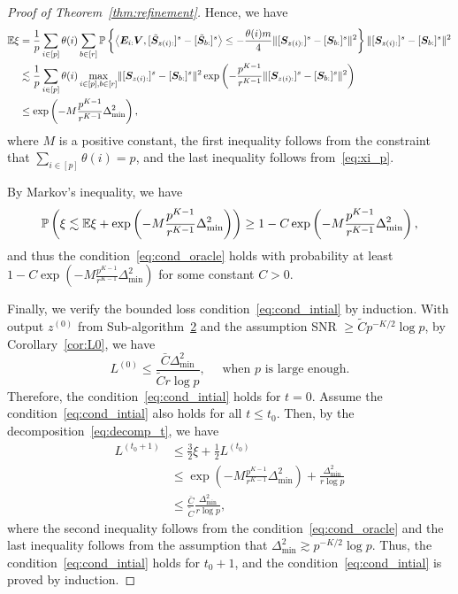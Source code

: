 \documentclass[lettersize,onecolumn,journal]{IEEEtran}
\theoremstyle{definition}
\theoremstyle{definition}
\newcommand{\of}[1]{\left(#1\right)}
\newcommand{\offf}[1]{\left\{#1\right\}}
\newcommand{\ang}[1]{\left\langle#1\right\rangle}
\begin{document}
\begin{proof}[Proof of Theorem~\ref{thm:refinement}]
    Hence, we have 
    \begin{align}
        \bbE \xi & =  \frac{1}{p} \sum_{i \in [p]} \theta(i) \sum_{b \in [r]} \bbP \offf{  \ang{ \mE_{i:} \mV, [  \tilde \mS_{z(i):} ]^s - [  \tilde \mS_{b:} ]^s }  \leq - \frac{\theta(i) m}{4} \onormSize{}{ [ \mS_{z(i):}  ]^s - [ \mS_{b:}  ]^s  }^2 } \onormSize{}{ [ \mS_{z(i):}  ]^s - [ \mS_{ b:}  ]^s  }^2 \\
        &\lesssim \frac{1}{p} \sum_{i \in [p]}  \theta(i) \max_{i \in [p], b \in [r]}  \onormSize{}{ [ \mS_{z(i):}  ]^s - [ \mS_{b:}  ]^s  }^2   \exp \of{  - \frac{p^{K-1}}{r^{K-1}}   \onormSize{}{ [ \mS_{z(i):}  ]^s - [ \mS_{b:}  ]^s  }^2 } \\
        & \leq \exp \of{  - M \frac{p^{K-1}}{r^{K-1}}   \Delta_{\min}^2 }, \label{eq:constant_M}
    \end{align}
    where $M$ is a positive constant, the first inequality follows from the constraint that $\sum_{i \in [p]} \theta(i) = p$, and the last inequality follows from~\eqref{eq:xi_p}.
    
    By Markov's inequality, we have 
    \begin{equation}
        \bbP\of{ \xi \lesssim \bbE \xi + \exp \of{  -M \frac{p^{K-1}}{r^{K-1}}   \Delta_{\min}^2 } } \geq 1 -  C \exp \of{  - M \frac{p^{K-1}}{r^{K-1}}   \Delta_{\min}^2 },
    \end{equation}
    and thus the condition~\eqref{eq:cond_oracle} holds with probability at least $1 -  C \exp \of{  - M\frac{p^{K-1}}{r^{K-1}}   \Delta_{\min}^2 }$ for some constant $C > 0$.
    
    Finally, we verify the bounded loss condition~\eqref{eq:cond_intial} by induction.  With output $z^{(0)}$ from Sub-algorithm~\hyperref[alg:main]{2} and the assumption SNR $\geq \tilde C p^{-K/2} \log p$, by Corollary~\ref{cor:L0}, we have 
    \begin{equation}
        L^{(0)} \leq \frac{\bar C \Delta_{\min}^2}{\tilde C r \log p},\quad \text{    when $p$ is large enough}.
    \end{equation}
Therefore, the condition~\eqref{eq:cond_intial} holds for $t = 0$. Assume the condition~\eqref{eq:cond_intial} also holds for all $t \leq t_0$. Then, by the decomposition~\eqref{eq:decomp_t}, we have 
    \begin{align}
         L^{(t_0+1)} &\leq \frac{3}{2} \xi + \frac{1}{2} L^{(t_0)} \\
         & \leq \exp \of{  - M \frac{p^{K-1}}{r^{K-1}}   \Delta_{\min}^2 } + \frac{\Delta_{\min}^2}{r \log p} \\
         & \leq \frac{\bar C}{\tilde C}\frac{\Delta_{\min}^2}{r\log p} ,
    \end{align}
    where the second inequality follows from the condition~\eqref{eq:cond_oracle} and the last inequality follows from the assumption that $\Delta_{\min}^2 \gtrsim p^{-K/2} \log p$. Thus, the condition~\eqref{eq:cond_intial} holds for $t_0 + 1$, and the condition~\eqref{eq:cond_intial} is proved by induction.
\end{proof}
\end{document}
